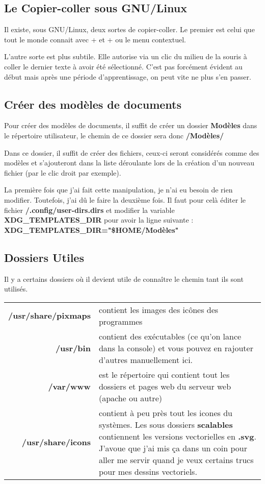 \documentclass[a4paper,twoside]{article}
\begin{document}
\subsection{Le Copier-coller sous GNU/Linux}
Il existe, sous GNU/Linux, deux sortes de copier-coller. Le premier est celui que tout le monde connait avec + et + ou le menu contextuel.\par
L'autre sorte est plus subtile. Elle autorise via un clic du milieu de la souris à coller le dernier texte à avoir été sélectionné. C'est pas forcément évident au début mais après une période d'apprentissage, on peut vite ne plus s'en passer.\par

\subsection{Créer des modèles de documents}
Pour créer des modèles de documents, il suffit de créer un dossier \textbf{Modèles} dans le répertoire utilisateur, le chemin de ce dossier sera donc \textbf{\texttildelow/Modèles/}

Dans ce dossier, il suffit de créer des fichiers, ceux-ci seront considérés comme des modèles et s'ajouteront dans la liste déroulante lors de la création d'un nouveau fichier (par le clic droit par exemple).

\begin{remarque}
La première fois que j'ai fait cette manipulation, je n'ai eu besoin de rien modifier. Toutefois, j'ai dû le faire la deuxième fois. Il faut pour celà éditer le fichier \textbf{\texttildelow/.config/user-dirs.dirs} et modifier la variable \textbf{XDG\_TEMPLATES\_DIR} pour avoir la ligne suivante : \textbf{XDG\_TEMPLATES\_DIR="\$HOME/Modèles"}
\end{remarque}

\subsection{Dossiers Utiles}
Il y a certains dossiers où il devient utile de connaître le chemin tant ils sont utilisés.

\begin{tabular}{>{\bfseries}r<{}@{ : }p{9cm}}
/usr/share/pixmaps & contient les images des icônes des programmes\\
/usr/bin & contient des exécutables (ce qu'on lance dans la console) et vous pouvez en rajouter d'autres manuellement ici.\\
/var/www & est le répertoire qui contient tout les dossiers et pages web du serveur web (apache ou autre)\\
/usr/share/icons & contient à peu près tout les icones du systèmes. Les sous dossiers \textbf{scalables} contiennent les versions vectorielles en \textbf{.svg}. J'avoue que j'ai mis ça dans un coin pour aller me servir quand je veux certains trucs pour mes dessins vectoriels.
\end{tabular}
\end{document}
